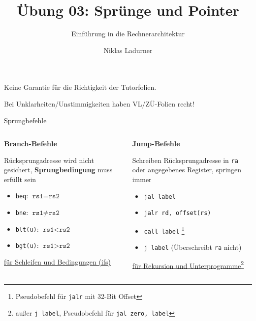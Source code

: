 \documentclass[
  german,            %
  aspectratio=169,    %
]{tumbeamer}
\title{Übung 03: Sprünge und Pointer}
\subtitle{Einführung in die Rechnerarchitektur}
\author{Niklas Ladurner}
\institute{\theChairName\\\theDepartmentName\\\theUniversityName}
\date{\DTMdisplaydate{2025}{10}{31}{-1}}
\begin{document}
\maketitle

\begin{frame}[c]{}{}
	\begin{center}
		\LARGE  Keine Garantie für die Richtigkeit der Tutorfolien.

		\Large Bei Unklarheiten/Unstimmigkeiten haben VL/ZÜ-Folien recht!
	\end{center}
\end{frame}

\begin{frame}[c, fragile]{Sprungbefehle}{}
	\vspace{-0.5cm}
	\begin{columns}
		\begin{column}{0.5\textwidth}
			\begin{center}\textbf{Branch-Befehle}\end{center}
			Rücksprungadresse wird nicht gesichert, \textbf{Sprungbedingung}
			muss erfüllt sein
			\vspace{0.5\baselineskip}
			\begin{itemize}
				\item \verb|beq|: $\texttt{rs1} = \texttt{rs2}$
				\item \verb|bne|: $\texttt{rs1} \ne \texttt{rs2}$
				\item \verb|blt(u)|: $\texttt{rs1} < \texttt{rs2}$
				\item \verb|bgt(u)|: $\texttt{rs1} > \texttt{rs2}$
			\end{itemize}
			\begin{center}
				\underline{für Schleifen und Bedingungen (ifs)}
			\end{center}
		\end{column}
		\begin{column}{0.5\textwidth}
			\begin{center}\textbf{Jump-Befehle}\end{center}
			Schreiben Rücksprungadresse in \texttt{ra} oder angegebenes Register,
			springen immer
			\vspace{0.5\baselineskip}
			\begin{itemize}
				\item \verb|jal label|
				\item \verb|jalr rd, offset(rs)|
				\item \verb|call label| \footnote[frame]{Pseudobefehl für \texttt{jalr} mit 32-Bit Offset}
				\item \verb|j label| (Überschreibt \texttt{ra} nicht)
			\end{itemize}
			\begin{center}
				\underline{für Rekursion und Unterprogramme\footnote[frame]{außer \texttt{j label}, Pseudobefehl für \texttt{jal zero, label}}}
			\end{center}
		\end{column}
	\end{columns}
\end{frame}
\end{document}
